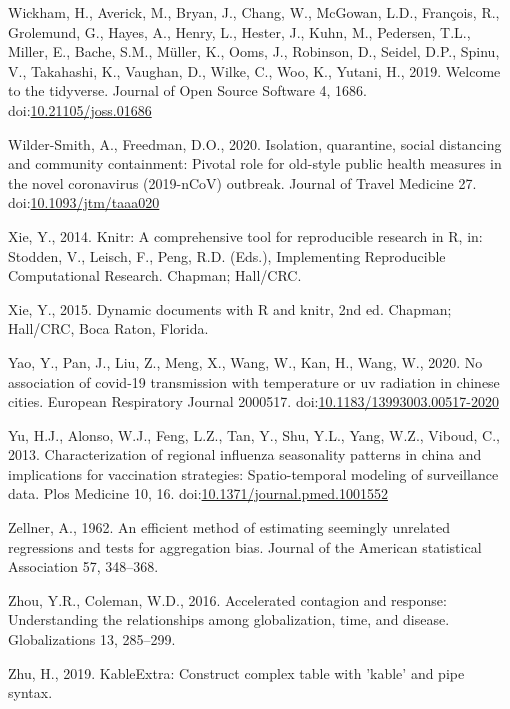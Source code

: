 \documentclass[]{elsarticle} %
\begin{document}
\leavevmode\hypertarget{ref-Wickham2019}{}%
Wickham, H., Averick, M., Bryan, J., Chang, W., McGowan, L.D., François,
R., Grolemund, G., Hayes, A., Henry, L., Hester, J., Kuhn, M., Pedersen,
T.L., Miller, E., Bache, S.M., Müller, K., Ooms, J., Robinson, D.,
Seidel, D.P., Spinu, V., Takahashi, K., Vaughan, D., Wilke, C., Woo, K.,
Yutani, H., 2019. Welcome to the tidyverse. Journal of Open Source
Software 4, 1686.
doi:\href{https://doi.org/10.21105/joss.01686}{10.21105/joss.01686}

\leavevmode\hypertarget{ref-Wilder2020isolation}{}%
Wilder-Smith, A., Freedman, D.O., 2020. Isolation, quarantine, social
distancing and community containment: Pivotal role for old-style public
health measures in the novel coronavirus (2019-nCoV) outbreak. Journal
of Travel Medicine 27.
doi:\href{https://doi.org/10.1093/jtm/taaa020}{10.1093/jtm/taaa020}

\leavevmode\hypertarget{ref-Xie2014}{}%
Xie, Y., 2014. Knitr: A comprehensive tool for reproducible research in
R, in: Stodden, V., Leisch, F., Peng, R.D. (Eds.), Implementing
Reproducible Computational Research. Chapman; Hall/CRC.

\leavevmode\hypertarget{ref-Xie2015}{}%
Xie, Y., 2015. Dynamic documents with R and knitr, 2nd ed. Chapman;
Hall/CRC, Boca Raton, Florida.

\leavevmode\hypertarget{ref-Yao2020association}{}%
Yao, Y., Pan, J., Liu, Z., Meng, X., Wang, W., Kan, H., Wang, W., 2020.
No association of covid-19 transmission with temperature or uv radiation
in chinese cities. European Respiratory Journal 2000517.
doi:\href{https://doi.org/10.1183/13993003.00517-2020}{10.1183/13993003.00517-2020}

\leavevmode\hypertarget{ref-Yu2013characterization}{}%
Yu, H.J., Alonso, W.J., Feng, L.Z., Tan, Y., Shu, Y.L., Yang, W.Z.,
Viboud, C., 2013. Characterization of regional influenza seasonality
patterns in china and implications for vaccination strategies:
Spatio-temporal modeling of surveillance data. Plos Medicine 10, 16.
doi:\href{https://doi.org/10.1371/journal.pmed.1001552}{10.1371/journal.pmed.1001552}

\leavevmode\hypertarget{ref-Zellner1962efficient}{}%
Zellner, A., 1962. An efficient method of estimating seemingly unrelated
regressions and tests for aggregation bias. Journal of the American
statistical Association 57, 348--368.

\leavevmode\hypertarget{ref-Zhou2016accelerated}{}%
Zhou, Y.R., Coleman, W.D., 2016. Accelerated contagion and response:
Understanding the relationships among globalization, time, and disease.
Globalizations 13, 285--299.

\leavevmode\hypertarget{ref-Zhu2019}{}%
Zhu, H., 2019. KableExtra: Construct complex table with 'kable' and pipe
syntax.
\end{document}
